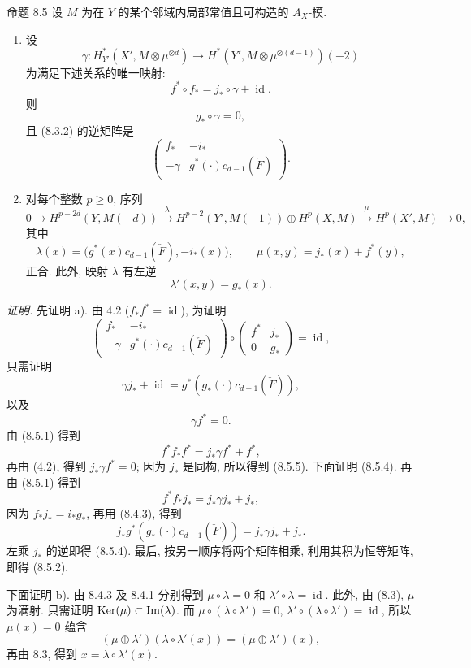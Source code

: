 \begin{statement}{命题 8.5}
设 $M$ 为在 $Y$ 的某个邻域内局部常值且可构造的 $A_X$-模.
\begin{enumerate}[label=\alph*)]
\item 设
\[
\gamma:H_{Y'}^*(X',M\otimes\mu^{\otimes d})\to
H^*(Y',M\otimes\mu^{\otimes(d-1)})(-2)
\]
为满足下述关系的唯一映射:
\[
f^*\circ f_* = j_*\circ\gamma+\operatorname{id}.
\tag{8.5.1}
\]
则
\[
g_*\circ\gamma=0,
\tag{8.5.2}
\]
且 (8.3.2) 的逆矩阵是
\[
\begin{pmatrix}
f_*&-i_*\\
-\gamma&g^*(\cdot)c_{d-1}(\check F)
\end{pmatrix}.
\tag{8.5.3}
\]
\item 对每个整数 $p\ge0$, 序列
\[
0\to H^{p-2d}(Y,M(-d))
\xrightarrow{\lambda}
H^{p-2}(Y',M(-1))\oplus H^p(X,M)
\xrightarrow{\mu}
H^p(X',M)\to0,
\]
其中
\[
\lambda(x)=\bigl(g^*(x)c_{d-1}(\check F),-i_*(x)\bigr),
\qquad
\mu(x,y)=j_*(x)+f^*(y),
\]
正合. 此外, 映射 $\lambda$ 有左逆
\[
\lambda'(x,y)=g_*(x).
\]
\end{enumerate}
\end{statement}

\emph{证明.} 先证明 a). 由 4.2 ($f_*f^*=\operatorname{id}$), 为证明
\[
\begin{pmatrix}
f_*&-i_*\\
-\gamma&g^*(\cdot)c_{d-1}(\check F)
\end{pmatrix}
\circ
\begin{pmatrix}
f^*&j_*\\
0&g_*
\end{pmatrix}
=\operatorname{id},
\]
只需证明
\[
\gamma j_*+\operatorname{id}=g^*(g_*(\cdot)c_{d-1}(\check F)),
\tag{8.5.4}
\]
以及
\[
\gamma f^*=0.
\tag{8.5.5}
\]
由 (8.5.1) 得到
\[
f^*f_*f^*=j_*\gamma f^*+f^*,
\]
再由 (4.2), 得到 $j_*\gamma f^*=0$; 因为 $j_*$ 是同构, 所以得到 (8.5.5). 下面证明 (8.5.4). 再由 (8.5.1) 得到
\[
f^*f_*j_*=j_*\gamma j_*+j_*,
\]
因为 $f_*j_*=i_*g_*$, 再用 (8.4.3), 得到
\[
j_*g^*(g_*(\cdot)c_{d-1}(\check F))=j_*\gamma j_*+j_*.
\]
左乘 $j_*$ 的逆即得 (8.5.4). 最后, 按另一顺序将两个矩阵相乘, 利用其积为恒等矩阵, 即得 (8.5.2).

下面证明 b). 由 8.4.3 及 8.4.1 分别得到 $\mu\circ\lambda=0$ 和 $\lambda'\circ\lambda=\operatorname{id}$. 此外, 由 (8.3), $\mu$ 为满射. 只需证明 $\operatorname{Ker}(\mu)\subset\operatorname{Im}(\lambda)$. 而 $\mu\circ(\lambda\circ\lambda')=0$, $\lambda'\circ(\lambda\circ\lambda')=\operatorname{id}$, 所以 $\mu(x)=0$ 蕴含
\[
(\mu\oplus\lambda')(\lambda\circ\lambda'(x))=(\mu\oplus\lambda')(x),
\]
再由 8.3, 得到 $x=\lambda\circ\lambda'(x)$.

